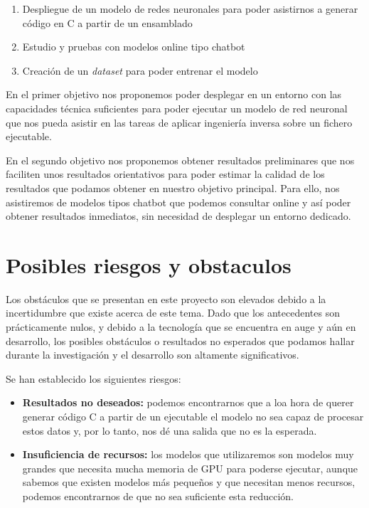 \begin{enumerate}
    \item Despliegue de un modelo de redes neuronales para poder asistirnos a generar
        código en C a partir de un ensamblado
    \item Estudio y pruebas con modelos online tipo chatbot
    \item Creación de un \textit{dataset} para poder entrenar el modelo
\end{enumerate}

En el primer objetivo nos proponemos poder desplegar en un entorno con las capacidades
técnica suficientes para poder ejecutar un modelo de red neuronal que nos pueda asistir en
las tareas de aplicar ingeniería inversa sobre un fichero ejecutable.

En el segundo objetivo nos proponemos obtener resultados preliminares que nos faciliten
unos resultados orientativos para poder estimar la calidad de los resultados que podamos
obtener en nuestro objetivo principal. Para ello, nos asistiremos de modelos tipos chatbot
que podemos consultar online y así poder obtener resultados inmediatos, sin necesidad
de desplegar un entorno dedicado.

\section{Posibles riesgos y obstaculos}
\label{sec:riesgos}


Los obstáculos que se presentan en este proyecto son elevados debido a la incertidumbre
que existe acerca de este tema. Dado que los antecedentes son prácticamente nulos, y
debido a la tecnología que se encuentra en auge y aún en desarrollo, los posibles obstáculos
o resultados no esperados que podamos hallar durante la investigación y el desarrollo
son altamente significativos.

Se han establecido los siguientes riesgos:

\begin{itemize}
    \item \textbf{Resultados no deseados:} podemos encontrarnos que a loa hora de querer
        generar código C a partir de un ejecutable el modelo no sea capaz de procesar estos datos
        y, por lo tanto, nos dé una salida que no es la esperada.
    \item \textbf{Insuficiencia de recursos:} los modelos que utilizaremos son modelos
        muy grandes que necesita mucha memoria de GPU para poderse ejecutar, aunque sabemos que
        existen modelos más pequeños y que necesitan menos recursos, podemos encontrarnos de
        que no sea suficiente esta reducción.
\end{itemize}

